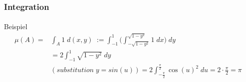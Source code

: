 \documentclass{beamer}
\begin{document}
\begin{frame}
    \frametitle{Integration}
\framesubtitle{}

    \begin{block}{Beispiel}
\begin{align*}
\mu(A) = & \int_A 1  \; d(x,y) \;  := \int_{-1}^{1} \Biggl( \int_{-\sqrt{1 - y^2} }^{\sqrt{1 - y^2} } 1 \;  dx \Biggr) \; dy \\ 
& =  2 \int_{-1}^{1}  \sqrt{1 - y^2}   \; dy  \\ 
 & (substitution \;   y = sin(u)) =   2 \int_{-\frac{\pi}{2}}^{\frac{\pi}{2}}   \cos(u)^2   \; du = 2 \cdot \frac{\pi}{2} = \pi
\end{align*}
\end{block}

 \end{frame}
\end{document}
